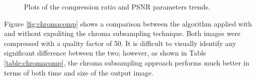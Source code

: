 \documentclass[14pt,a4paper]{extarticle}
\begin{document}
\begin{figure}[ht!]
     \begin{center}
%
    \end{center}
    \caption{Plots of the compression ratio and PSNR parameters trends.}
    \label{fig:plots}
\end{figure}

Figure \ref{fig:chromacomp} shows a comparison between the algorithm applied with and without expoliting the chroma subsampling technique. Both images were compressed with a quality factor of 50. It is difficult to visually identify any significant difference between the two; however, as shown in Table \ref{table:chromacomp}, the chroma subsampling approach performs much better in terms of both time and size of the output image.
\end{document}
